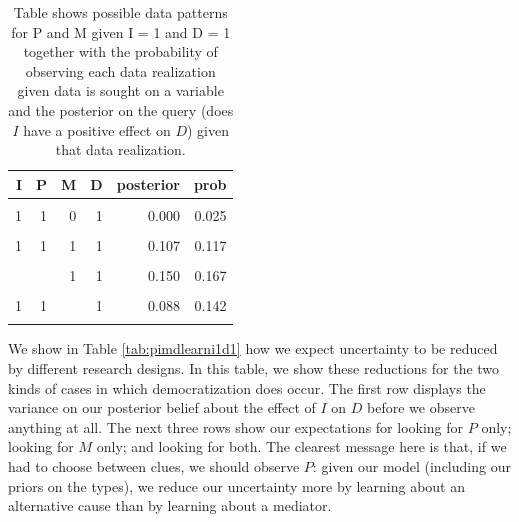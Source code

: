 \documentclass[
  12pt,
]{book}
\begin{document}
\begin{table}

\caption{\label{tab:possibleoutcomespimdi1}Table shows possible data patterns for P and M given I = 1 and D = 1 together with the probability of observing each data realization given data is sought on a variable and the posterior on the query (does $I$ have a positive effect on $D$) given that data realization.}
\centering
\begin{tabular}[t]{rrrrrr}
\toprule
I & P & M & D & posterior & prob\\
\midrule
\cellcolor{gray!6}{1} & \cellcolor{gray!6}{0} & \cellcolor{gray!6}{0} & \cellcolor{gray!6}{1} & \cellcolor{gray!6}{0.000} & \cellcolor{gray!6}{0.004}\\
1 & 1 & 0 & 1 & 0.000 & 0.025\\
\cellcolor{gray!6}{1} & \cellcolor{gray!6}{0} & \cellcolor{gray!6}{1} & \cellcolor{gray!6}{1} & \cellcolor{gray!6}{0.250} & \cellcolor{gray!6}{0.050}\\
1 & 1 & 1 & 1 & 0.107 & 0.117\\
\cellcolor{gray!6}{1} & \cellcolor{gray!6}{} & \cellcolor{gray!6}{0} & \cellcolor{gray!6}{1} & \cellcolor{gray!6}{0.000} & \cellcolor{gray!6}{0.029}\\
\addlinespace
1 &  & 1 & 1 & 0.150 & 0.167\\
\cellcolor{gray!6}{1} & \cellcolor{gray!6}{0} & \cellcolor{gray!6}{} & \cellcolor{gray!6}{1} & \cellcolor{gray!6}{0.231} & \cellcolor{gray!6}{0.054}\\
1 & 1 &  & 1 & 0.088 & 0.142\\
\cellcolor{gray!6}{1} & \cellcolor{gray!6}{} & \cellcolor{gray!6}{} & \cellcolor{gray!6}{1} & \cellcolor{gray!6}{0.128} & \cellcolor{gray!6}{0.196}\\
\bottomrule
\end{tabular}
\end{table}

We show in Table \ref{tab:pimdlearni1d1} how we expect uncertainty to be reduced by different research designs. In this table, we show these reductions for the two kinds of cases in which democratization does occur. The first row displays the variance on our posterior belief about the effect of \(I\) on \(D\) before we observe anything at all. The next three rows show our expectations for looking for \(P\) only; looking for \(M\) only; and looking for both. The clearest message here is that, if we had to choose between clues, we should observe \(P\): given our model (including our priors on the types), we reduce our uncertainty more by learning about an alternative cause than by learning about a mediator.
\end{document}
